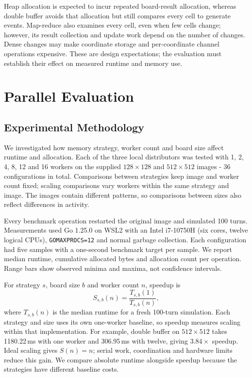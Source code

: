 \documentclass[10pt,a4paper,twocolumn]{article}
\begin{document}
Heap allocation is expected to incur repeated board-result allocation,
whereas double buffer avoids that allocation but still compares every
cell to generate events. Map-reduce also examines every cell, even when
few cells change; however, its result collection and update work depend on
the number of changes. Dense changes may make coordinate storage and
per-coordinate channel operations expensive. These are design expectations;
the evaluation must establish their effect on measured runtime and memory
use.

\section{Parallel Evaluation}

\subsection{Experimental Methodology}

We investigated how memory strategy, worker count and board size affect
runtime and allocation. Each of the three local distributors was tested
with 1, 2, 4, 8, 12 and 16 workers on the supplied $128\times128$ and
$512\times512$ images - 36 configurations in total. Comparisons between
strategies keep image and worker count fixed; scaling comparisons vary workers
within the same strategy and image. The images contain different
patterns, so comparisons between sizes also reflect differences in activity.

Every benchmark operation restarted the original image and simulated
100 turns. Measurements used Go 1.25.0 on WSL2 with an Intel i7-10750H
(six cores, twelve logical CPUs), \texttt{GOMAXPROCS=12} and normal garbage
collection. Each configuration had five samples with a one-second benchmark
target per sample. We report median runtime, cumulative allocated bytes and
allocation count per operation. Range bars show observed minima and maxima,
not confidence intervals.

For strategy $s$, board size $b$ and worker count $n$, speedup is
\[
S_{s,b}(n)=\frac{T_{s,b}(1)}{T_{s,b}(n)},
\]
where $T_{s,b}(n)$ is the median runtime for a fresh 100-turn simulation.
Each strategy and size uses its own one-worker baseline, so speedup measures
scaling within that implementation. For example, double buffer on
$512\times512$ takes 1180.22\,ms with one worker and 306.95\,ms with twelve,
giving $3.84\times$ speedup. Ideal scaling gives $S(n)=n$; serial work,
coordination and hardware limits reduce this gain. We compare absolute runtime
alongside speedup because the strategies have different baseline costs.
\end{document}
